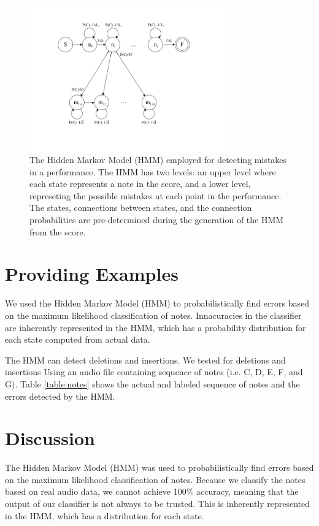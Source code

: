 \documentclass[twocolumn]{article}
\begin{document}
\begin{figure}
  \includegraphics[width=0.75\textwidth]{figures/hmm.png}
  \caption{The Hidden Markov Model (HMM) employed for detecting mistakes in a performance. The HMM has two levels: an upper level where each state represents a note in the score, and a lower level, represeting the possible mistakes at each point in the performance. The states, connections between states, and the connection probabilities are pre-determined during the generation of the HMM from the score.}\label{fig:hmm}
\end{figure}

\section{Providing Examples}

We used the Hidden Markov Model (HMM) to probabilistically find errors based on the maximum likelihood classification of notes. Innacuracies in the classifier are inherently represented in the HMM, which has a probability distribution for each state computed from actual data.

The HMM can detect deletions and insertions. We tested for deletions and insertions Using an audio file containing sequence of notes (i.e. C, D, E, F, and G). Table \ref{table:notes} shows the actual and labeled sequence of notes and the errors detected by the HMM.

\section{Discussion}

The Hidden Markov Model (HMM) was used to probabilistically find errors based on the maximum likelihood classification of notes. Because we classify the notes based on real audio data, we cannot achieve 100\% accuracy, meaning that the output of our classifier is not always to be trusted. This is inherently represented in the HMM, which has a distribution for each state.
\end{document}
